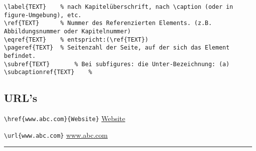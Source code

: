\setlength{\columnseprule}{0.5pt}

\negAbstand
%
\begin{lstlisting}
\label{TEXT}	% nach Kapitelüberschrift, nach \caption (oder in figure-Umgebung), etc.
\ref{TEXT}		% Nummer des Referenzierten Elements. (z.B. Abbildungsnummer oder Kapitelnummer)
\eqref{TEXT} 	% entspricht:(\ref{TEXT})
\pageref{TEXT}	% Seitenzahl der Seite, auf der sich das Element befindet.
\subref{TEXT}		% Bei subfigures: die Unter-Bezeichnung: (a)
\subcaptionref{TEXT}	% 
\end{lstlisting}

\subsection*{URL's}
\lstinline|\href{www.abc.com}{Website}|  \href{www.anything.com}{Website}

\noindent\lstinline|\url{www.abc.com}|
\url{www.abc.com} \newline

\hrule %
